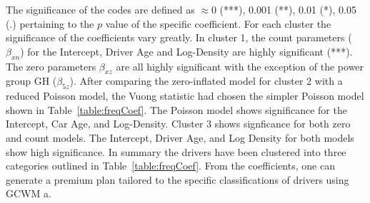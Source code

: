 \documentclass[11pt,letterpaper]{article}
\numberwithin{equation}{section}
\numberwithin{equation}{section}
\numberwithin{equation}{section}
\begin{document}
The significance of the codes are defined as $\approx 0$  (***), 0.001 (**), 0.01 (*), 0.05 (.) %
pertaining to the $p$ value of the specific coefficient. For each cluster the significance of the coefficients vary greatly. In cluster 1, the count parameters ($\beta_{xn}$) for the Intercept, Driver Age and Log-Density are highly significant (***). The zero parameters $\beta_{xz}$ are all highly significant with the exception of the power group GH ($\beta_{5z}$). After comparing the zero-inflated model for cluster 2 with a reduced Poisson model, the Vuong statistic had chosen the simpler Poisson model shown in Table~\ref{table:freqCoef}. The Poisson model shows significance for the Intercept, Car Age, and Log-Density. Cluster 3 shows signficance for both zero and count models. The Intercept, Driver Age, and Log Density for both models show high significance.
In summary the drivers have been clustered into three categories outlined in Table~\ref{table:freqCoef}. From the coefficients, one can generate a premium plan tailored to the specific classifications of drivers using GCWM a.
\end{document}

